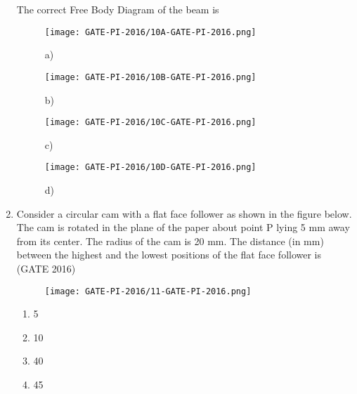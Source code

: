 \documentclass[journal,12pt,onecolumn]{IEEEtran}
\theoremstyle{remark}
\begin{document}
\begin{enumerate}
The correct Free Body Diagram of the beam is  

\begin{figure}[H]
    \centering
    \begin{minipage}{0.45\linewidth}
        \centering
        \texttt{[image: GATE-PI-2016/10A-GATE-PI-2016.png]}
        \caption{a)}
        \label{q10a}
    \end{minipage}\hfill
    \begin{minipage}{0.45\linewidth}
        \centering
        \texttt{[image: GATE-PI-2016/10B-GATE-PI-2016.png]}
          \caption{b)}
        \label{q10b}
    \end{minipage}

    \vspace{0.5cm}

    \begin{minipage}{0.45\linewidth}
        \centering
        \texttt{[image: GATE-PI-2016/10C-GATE-PI-2016.png]}
         \caption{c)}
        \label{q10c}
    \end{minipage}\hfill
    \begin{minipage}{0.45\linewidth}
        \centering
        \texttt{[image: GATE-PI-2016/10D-GATE-PI-2016.png]}
        \caption*{d)}
        \label{q10d}
    \end{minipage}
\end{figure}

\vspace{1cm}
\newpage
\item Consider a circular cam with a flat face follower as shown in the figure below. 
The cam is rotated in the plane of the paper about point P lying 5 mm away from its center. 
The radius of the cam is 20 mm. The distance (in mm) between the highest and the lowest 
positions of the flat face follower is \hfill{(GATE 2016)} 

\begin{figure}[H]
    \centering
    \texttt{[image: GATE-PI-2016/11-GATE-PI-2016.png]}
    \caption{}
    \label{q11}
\end{figure}

\begin{multicols}{4}
  \begin{enumerate}
      \item 5
      \item 10
      \item 40
      \item 45
  \end{enumerate}  
\end{multicols}


\end{enumerate}
\end{document}
